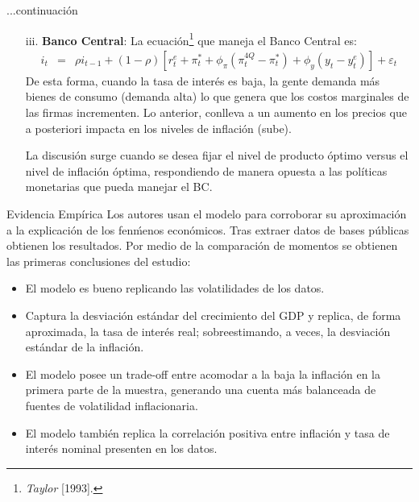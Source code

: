 \documentclass{beamer}
\begin{document}
\begin{frame}{...continuaci\'on}
\begin{itemize}
\item[iii.]{\textbf{Banco Central}:}
La ecuaci\'on\footnote{\emph{Taylor} [1993].} que maneja el Banco Central es:
\begin{eqnarray*}
i_{t} & = & \rho i_{t-1}+(1-\rho)[r_{t}^{e}+\pi_{t}^{*}+\phi_{\pi}(\pi_{t}^{4Q}-\pi_{t}^{*})+\phi_{y}(y_{t}-y_{t}^{e})]+\varepsilon_{t}
\end{eqnarray*}
De esta forma, cuando la tasa de inter\'es es baja, la gente demanda m\'as bienes de consumo (demanda alta) lo que genera que los costos marginales de las firmas incrementen. Lo anterior, conlleva a un aumento en los precios que a posteriori impacta en los niveles de inflaci\'on (sube).

\medskip
La discusi\'on surge cuando se desea fijar el nivel de producto \'optimo versus el nivel de inflaci\'on \'optima, respondiendo de manera opuesta a las pol\'iticas monetarias que pueda manejar el BC.
\end{itemize}
\end{frame}

\begin{frame}{Evidencia Emp\'irica}
Los autores usan el modelo para corroborar su aproximaci\'on a la explicaci\'on de los fen\'menos econ\'omicos. Tras extraer datos de bases p\'ublicas obtienen los resultados. Por medio de la comparaci\'on de momentos se obtienen las primeras conclusiones del estudio:
\begin{itemize}
\item{El modelo es bueno replicando las volatilidades de los datos.}
\item{Captura la desviaci\'on est\'andar del crecimiento del GDP y replica, de forma aproximada, la tasa de inter\'es real; sobreestimando, a veces, la desviaci\'on est\'andar de la inflaci\'on.}
\item{El modelo posee un trade-off entre acomodar a la baja la inflaci\'on en la primera parte de la muestra, generando una cuenta m\'as balanceada de fuentes de volatilidad inflacionaria.}
\item{El modelo tambi\'en replica la correlaci\'on positiva entre inflaci\'on y tasa de inter\'es nominal presenten en los datos.}
\end{itemize}
\end{frame}
\end{document}
